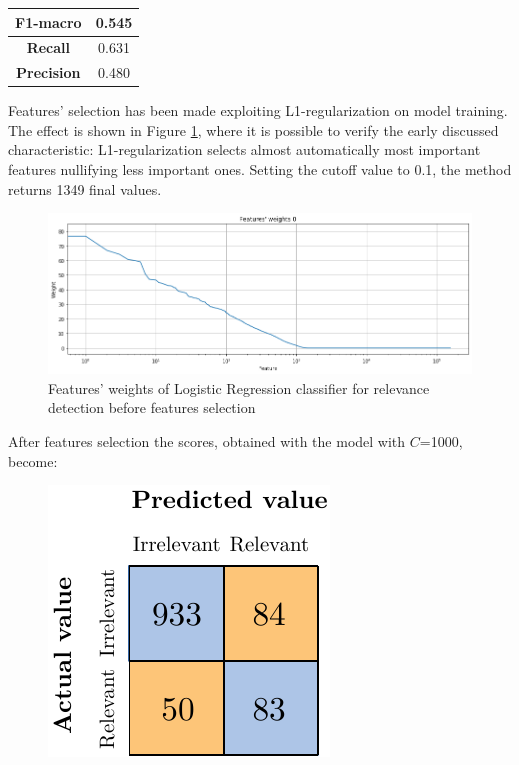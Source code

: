 \begin{center}
	\begin{tabular}{ | c | c | } 
		\hline
		\textbf{F1-macro} & 0.545 \\
		\hline
		\textbf{Recall} & 0.631 \\ 
		\hline
		\textbf{Precision} & 0.480 \\ 
		\hline
	\end{tabular}
\end{center}

Features' selection has been made exploiting L1-regularization on model training. The effect is shown in Figure \ref{fig:ita_rel_logreg_fs}, where it is possible to verify the early discussed characteristic: L1-regularization selects almost automatically most important features nullifying less important ones. Setting the cutoff value to 0.1, the method returns 1349 final values.\\

\begin{figure}[H]
	\centering
	\includegraphics[width=\textwidth]{figures/conf_matrices/ita_rel_logreg/ita_rel_logreg_fs.png}
	\caption{Features' weights of Logistic Regression classifier for relevance detection before features selection}
	\label{fig:ita_rel_logreg_fs}
\end{figure}

After features selection the scores, obtained with the model with $C$=1000, become:

\begin{figure}[H]
	\centering
	\includegraphics[scale=1]{figures/conf_matrices/ita_rel_logreg/ita_rel_logreg_afs.pdf}
	\label{fig:ita_rel_logreg_afs}
\end{figure}

